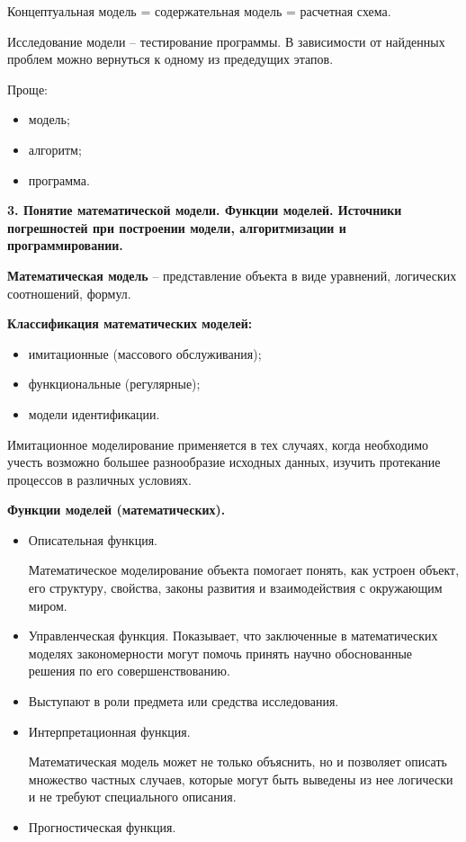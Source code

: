 \documentclass[a4paper,14pt]{article}
\begin{document}
Концептуальная модель = содержательная модель = расчетная схема.

Исследование модели -- тестирование программы. В зависимости от найденных проблем
можно вернуться к одному из предедущих этапов.

Проще:

\begin{itemize}
	\item модель;
	\item алгоритм;
	\item программа.
\end{itemize}

\textbf{3. Понятие математической модели. Функции моделей. Источники погрешностей при построении модели, алгоритмизации и программировании.}

\textbf{Математическая модель} -- представление объекта в виде уравнений, логических соотношений, формул.

\textbf{Классификация математических моделей:}

\begin{itemize}
	\item имитационные (массового обслуживания);
	\item функциональные (регулярные);
	\item модели идентификации.
\end{itemize}

Имитационное моделирование применяется в тех случаях, когда необходимо
учесть возможно большее разнообразие исходных данных, изучить
протекание процессов в различных условиях.

\textbf{Функции моделей (математических).}
\begin{itemize}
	\item Описательная функция.
	
	Математическое моделирование объекта помогает понять, как устроен объект, его структуру, свойства, законы развития и взаимодействия с окружающим миром.
	
	\item Управленческая функция.
	Показывает, что заключенные в математических моделях закономерности могут помочь принять научно обоснованные решения по его совершенствованию.
	\item Выступают в роли предмета или средства исследования.
	\item Интерпретационная функция.
	
	Математическая модель может не только объяснить, но и позволяет описать множество частных случаев, которые могут быть выведены из нее логически и не требуют специального описания.
	\item Прогностическая функция.
\end{itemize}
\end{document}
